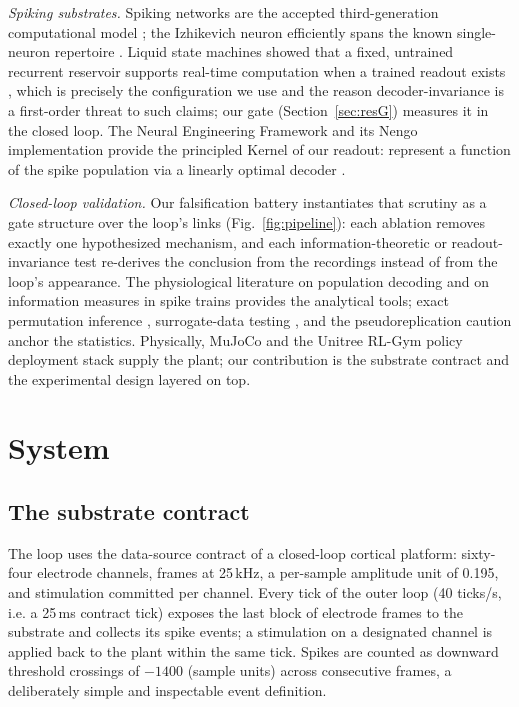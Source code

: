 \emph{Spiking substrates.} Spiking networks are the accepted third-generation
computational model \cite{maass1997}; the Izhikevich neuron efficiently spans
the known single-neuron repertoire \cite{izhikevich2003,izhikevich2004}. Liquid
state machines showed that a fixed, untrained recurrent reservoir supports
real-time computation when a trained readout exists \cite{maass2002liquid},
which is precisely the configuration we use and the reason decoder-invariance
is a first-order threat to such claims; our gate
(Section~\ref{sec:resG}) measures it in the closed loop. The Neural
Engineering Framework and its Nengo implementation provide the principled
Kernel of our readout: represent a function of the spike population via a
linearly optimal decoder \cite{eliasmith2003,bekolay2014}.

\emph{Closed-loop validation.} Our falsification battery instantiates that
scrutiny as a gate structure over the loop's links
(Fig.~\ref{fig:pipeline}): each ablation removes exactly one hypothesized
mechanism, and each information-theoretic or readout-invariance test re-derives
the conclusion from the recordings instead of from the loop's appearance. The
physiological literature on population decoding
\cite{georgopoulos1986,quiroga2009,paninski2004} and on information measures in
spike trains \cite{schreiber2000,kraskov2004,panzeri2007,walker2018} provides
the analytical tools; exact permutation inference \cite{ernst2004},
surrogate-data testing \cite{theiler1992}, and the pseudoreplication caution
\cite{hurlbert1984} anchor the statistics. Physically, MuJoCo
\cite{todorov2012} and the Unitree RL-Gym policy deployment stack
\cite{unitree_rl_gym} supply the plant; our contribution is the substrate
contract and the experimental design layered on top.

\section{System}

\subsection{The substrate contract}

The loop uses the data-source contract of a closed-loop cortical platform:
sixty-four electrode channels, frames at 25\,kHz, a per-sample amplitude unit of
0.195, and stimulation committed per channel. Every tick of the outer loop
(40 ticks/s, i.e. a 25\,ms contract tick) exposes the last block of electrode
frames to the substrate and collects its spike events; a stimulation on a
designated channel is applied back to the plant within the same tick. Spikes
are counted as downward threshold crossings of $-1400$ (sample units) across
consecutive frames, a deliberately simple and inspectable event definition.

